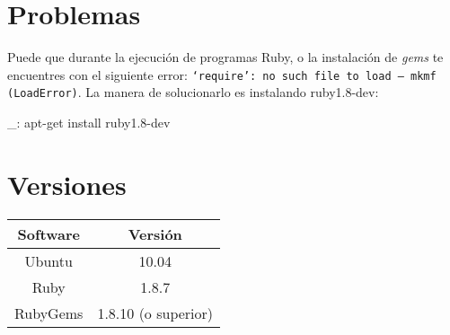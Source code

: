 \section{Problemas}

Puede que durante la ejecución de programas Ruby, o la instalación de \emph{gems} te encuentres con el siguiente error: \texttt{`require': no such file to load -- mkmf (LoadError)}. La manera de solucionarlo es instalando ruby1.8-dev:

\begin{bashcode}
_: apt-get install ruby1.8-dev
\end{bashcode}


\section{Versiones}

\begin{tabular}{|c|c|}
   \hline
   Software & Versión \\ \hline
   Ubuntu & 10.04 \\ \hline
   Ruby & 1.8.7 \\ \hline
   RubyGems & 1.8.10 (o superior) \\ \hline
\end{tabular}

